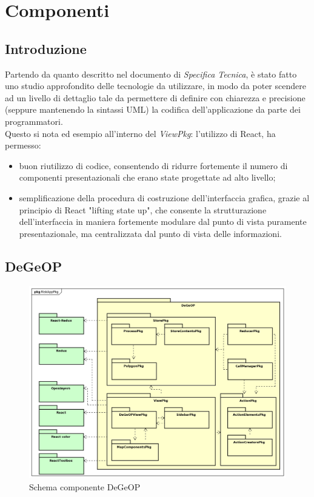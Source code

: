\section{Componenti}
\subsection{Introduzione}
 Partendo da quanto descritto nel documento di \textit{Specifica Tecnica}, è stato fatto uno studio approfondito delle tecnologie da utilizzare, in modo da poter scendere ad un livello di dettaglio tale da permettere di definire con chiarezza e precisione (seppure mantenendo la sintassi UML) la codifica dell'applicazione da parte dei programmatori.\\
 Questo si nota ed esempio all'interno del \textit{ViewPkg}: l'utilizzo di React, ha permesso:
 \begin{itemize}
	\item buon riutilizzo di codice, consentendo di ridurre fortemente il numero di componenti presentazionali che erano state progettate ad alto livello;
	\item semplificazione della procedura di costruzione dell'interfaccia grafica, grazie al principio di React "lifting state up", che consente la strutturazione dell'interfaccia in maniera fortemente modulare dal punto di vista puramente presentazionale, ma centralizzata dal punto di vista delle informazioni.
\end{itemize}
\subsection{DeGeOP}
\label{pkg::DeGeOP}
\begin{figure}[H]
	\centering
	\includegraphics[width=\textwidth]{img/PkgDiagram/DeGeOPPkg.png}
	\caption{Schema componente DeGeOP}
\end{figure}
